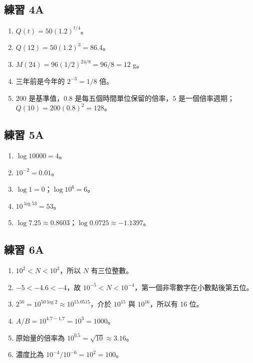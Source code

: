 \documentclass[11pt,a4paper]{article}
\providecommand{\tightlist}{%
  \setlength{\itemsep}{0pt}\setlength{\parskip}{0pt}}
\begin{document}
\subsection{練習 4A}\label{ux7df4ux7fd2-4a-1}

\begin{enumerate}
\def\labelenumi{\arabic{enumi}.}
\tightlist
\item
  \(Q(t)=50(1.2)^{t/4}\)。
\item
  \(Q(12)=50(1.2)^3=86.4\)。
\item
  \(M(24)=96(1/2)^{24/8}=96/8=12\) g。
\item
  三年前是今年的 \(2^{-3}=1/8\) 倍。
\item
  \(200\) 是基準值，\(0.8\) 是每五個時間單位保留的倍率，\(5\) 是一個倍率週期；\(Q(10)=200(0.8)^2=128\)。
\end{enumerate}

\subsection{練習 5A}\label{ux7df4ux7fd2-5a-1}

\begin{enumerate}
\def\labelenumi{\arabic{enumi}.}
\tightlist
\item
  \(\log10000=4\)。
\item
  \(10^{-2}=0.01\)。
\item
  \(\log1=0\)；\(\log10^6=6\)。
\item
  \(10^{\log53}=53\)。
\item
  \(\log7.25\approx0.8603\)；\(\log0.0725\approx-1.1397\)。
\end{enumerate}

\subsection{練習 6A}\label{ux7df4ux7fd2-6a-1}

\begin{enumerate}
\def\labelenumi{\arabic{enumi}.}
\tightlist
\item
  \(10^2<N<10^3\)，所以 \(N\) 有三位整數。
\item
  \(-5<-4.6<-4\)，故 \(10^{-5}<N<10^{-4}\)，第一個非零數字在小數點後第五位。
\item
  \(2^{50}=10^{50\log2}\approx10^{15.0515}\)，介於 \(10^{15}\) 與 \(10^{16}\)，所以有 16 位。
\item
  \(A/B=10^{4.7-1.7}=10^3=1000\)。
\item
  原始量的倍率為 \(10^{0.5}=\sqrt{10}\approx3.16\)。
\item
  濃度比為 \(10^{-4}/10^{-6}=10^2=100\)。
\end{enumerate}
\end{document}
